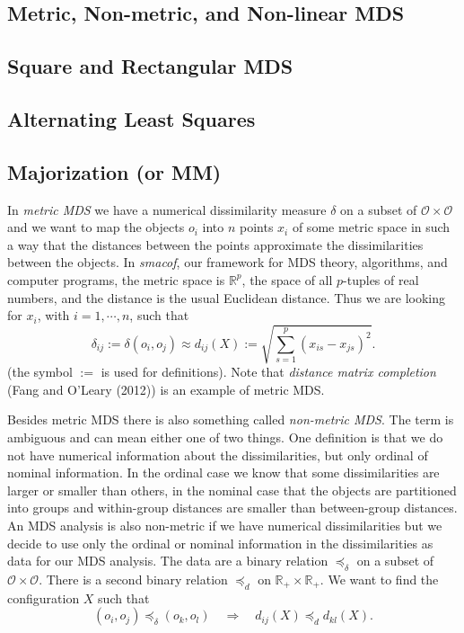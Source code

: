 \documentclass[
  12pt,
]{article}
\begin{document}
\subsection{Metric, Non-metric, and Non-linear MDS}\label{metric-non-metric-and-non-linear-mds}

\subsection{Square and Rectangular MDS}\label{square-and-rectangular-mds}

\subsection{Alternating Least Squares}\label{alternating-least-squares}

\subsection{Majorization (or MM)}\label{majorization-or-mm}

In \emph{metric MDS} we have a numerical dissimilarity measure \(\delta\) on
a subset of \(\mathcal{O}\times\mathcal{O}\) and we want to
map the objects \(o_i\) into \(n\) points \(x_i\) of some metric space in such
a way that the distances between the points approximate the
dissimilarities between the objects. In \emph{smacof}, our framework for MDS
theory, algorithms, and computer programs, the metric space is
\(\mathbb{R}^p\), the space of all \(p\)-tuples of real numbers, and the distance is the usual Euclidean distance. Thus we are looking for
\(x_i\), with \(i=1,\cdots,n\), such that
\begin{equation}
\delta_{ij}:=\delta(o_i,o_j)\approx d_{ij}(X):=\sqrt{\sum_{s=1}^p(x_{is}-x_{js})^2}.
\label{eq:mdsdef}
\end{equation}
(the symbol \(:=\) is used for definitions). Note that \emph{distance matrix completion} (Fang and O'Leary (2012)) is an example of metric MDS.

Besides metric MDS there is also something called \emph{non-metric MDS}. The term is ambiguous and can mean either one of two things. One definition is that we do not have numerical information about the dissimilarities, but only
ordinal of nominal information. In the ordinal case we know that some dissimilarities are larger or smaller than others, in the nominal case
that the objects are partitioned into groups and within-group
distances are smaller than between-group distances. An MDS analysis
is also non-metric if we have numerical dissimilarities but we decide
to use only the ordinal or nominal information in the dissimilarities
as data for our MDS analysis. The data are a binary relation \(\preceq_\delta\) on a subset of
\(\mathcal{O}\times\mathcal{O}\). There is a second binary relation \(\preceq_d\) on
\(\mathbb{R}_+\times\mathbb{R}_+\). We want to find the configuration \(X\)
such that
\begin{equation}
(o_i,o_j)\preceq_\delta(o_k,o_l)\quad\Rightarrow\quad d_{ij}(X)\preceq_d d_{kl}(X).
\label{eq:relations}
\end{equation}
\end{document}
